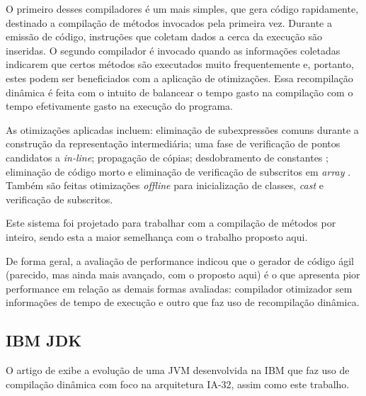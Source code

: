 O primeiro desses compiladores é um
mais simples, que gera código rapidamente, destinado a compilação
de métodos invocados pela primeira vez. Durante a emissão de código,
instruções que coletam dados a cerca da execução são inseridas.
O segundo compilador é
invocado quando as informações coletadas indicarem que certos métodos
são executados muito frequentemente e, portanto, estes podem ser
beneficiados com a aplicação de otimizações.
Essa recompilação dinâmica
é feita com o intuito de balancear o tempo gasto na compilação com o tempo
efetivamente gasto na execução do programa.

As otimizações aplicadas incluem: eliminação de subexpressões comuns
\cite{muchnick} durante a construção da representação intermediária;
uma fase de verificação de pontos candidatos a \textit{in-line};
propagação de cópias; desdobramento de constantes \cite{muchnick};
eliminação de código morto e eliminação de verificação de subscritos em
\textit{array} \cite{boundcheck}. Também são feitas otimizações
\textit{offline} para inicialização de classes, \textit{cast} e
verificação de subscritos.

Este sistema foi projetado para trabalhar com
a compilação de métodos por inteiro, sendo esta a maior semelhança com
o trabalho proposto aqui.

De forma geral, a avaliação de performance indicou que o gerador de
código ágil (parecido, mas ainda mais
avançado, com o proposto aqui) é o que apresenta pior performance em
relação as demais formas avaliadas: compilador otimizador sem
informações de tempo de execução e outro que faz uso de recompilação
dinâmica.

\subsection{IBM JDK}


O artigo de  exibe a evolução
de uma JVM desenvolvida na IBM que faz uso de compilação dinâmica com
foco na arquitetura IA-32, assim como este trabalho.

